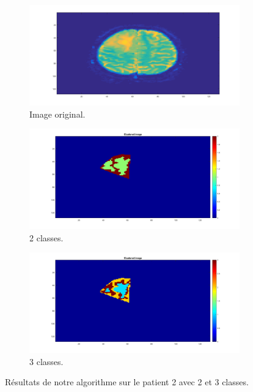 \begin{figure}[H]
\centering
\begin{subfigure}{.5\textwidth}
    \centering
    \includegraphics[scale=0.2,angle=0]{Images/TrueclassBrain.png}
    \caption{Image original.}
    \label{fig:TrueclassBrain} 
\end{subfigure}
\begin{subfigure}{.33\textwidth}
    \centering
    \includegraphics[scale=0.2,angle=0]{Images/2classBrain.png}
    \caption{2 classes.}
    \label{fig:2classBrain} 
\end{subfigure}
\begin{subfigure}{.33\textwidth}
    \centering
    \includegraphics[scale=0.2,angle=0]{Images/3classBrain.png}
    \caption{3 classes.}
    \label{fig:3classBrain} 
\end{subfigure}
    \caption{Résultats de notre algorithme sur le patient 2 avec 2 et 3 classes.}
    \label{fig:2and3classBrain} 
\end{figure}









